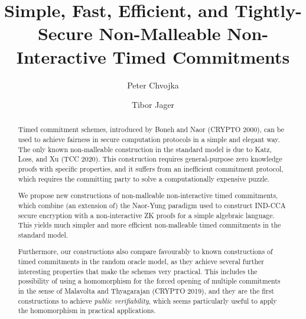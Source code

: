 \documentclass{llncs}
\author{Peter Chvojka\inst{1} \and Tibor Jager\inst{2}}
\institute{IMDEA Software Institute, \url{chvojka.p@gmail.com} \and University of Wuppertal, \url{jager@uni-wuppertal.de}}
\begin{document}
\title{Simple, Fast, Efficient, and Tightly-Secure Non-Malleable Non-Interactive Timed Commitments}


\maketitle
\begin{abstract}
Timed commitment schemes, introduced by Boneh and Naor (CRYPTO 2000), can be used to achieve fairness in secure computation protocols in a simple and elegant way.
The only known non-malleable construction in the standard model is due to Katz, Loss, and Xu (TCC 2020). This construction requires general-purpose zero knowledge proofs with specific properties, and it suffers from an inefficient commitment protocol, which requires the committing party to solve a computationally expensive puzzle.

We propose new constructions of non-malleable non-interactive timed commitments, which combine (an extension of) the Naor-Yung paradigm used to construct IND-CCA secure encryption with a non-interactive ZK proofs for a simple algebraic language. This yields much simpler and more efficient non-malleable timed commitments in the standard model.

Furthermore, our constructions also compare favourably to known constructions of timed commitments in the random oracle model, as they achieve several further interesting properties that make the schemes very practical. This includes the possibility of using a homomorphism for the forced opening of multiple commitments in the sense of Malavolta and Thyagarajan (CRYPTO 2019), and they are the first constructions to achieve \emph{public verifiability}, which seems particularly useful to apply the homomorphism in practical applications.
\end{abstract}


















\begin{appendix}

%


\end{appendix}
\end{document}
